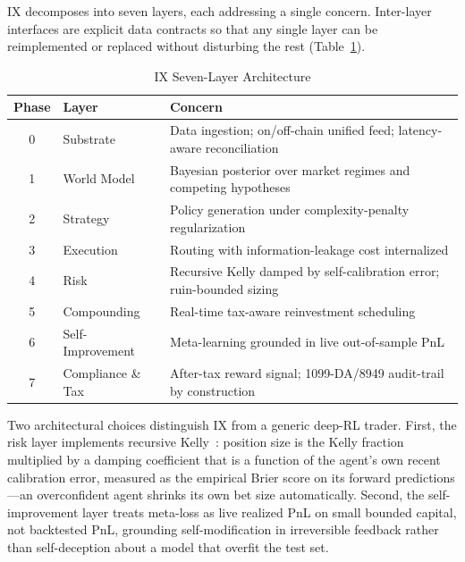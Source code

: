 \documentclass[conference,10pt,letterpaper]{IEEEtran}
\begin{document}
IX decomposes into seven layers, each addressing a single concern.
Inter-layer interfaces are explicit data contracts so that any single layer
can be reimplemented or replaced without disturbing the rest
(Table~\ref{tab:architecture}).

\begin{table}[!t]
\caption{IX Seven-Layer Architecture}
\label{tab:architecture}
\centering
\renewcommand{\arraystretch}{1.15}
\begin{tabularx}{\columnwidth}{@{}c l X@{}}
\toprule
\textbf{Phase} & \textbf{Layer} & \textbf{Concern} \\
\midrule
0 & Substrate                  & Data ingestion; on/off-chain unified feed; latency-aware reconciliation \\
1 & World Model                & Bayesian posterior over market regimes and competing hypotheses \\
2 & Strategy                   & Policy generation under complexity-penalty regularization \\
3 & Execution                  & Routing with information-leakage cost internalized \\
4 & Risk                       & Recursive Kelly damped by self-calibration error; ruin-bounded sizing \\
5 & Compounding                & Real-time tax-aware reinvestment scheduling \\
6 & Self-Improvement           & Meta-learning grounded in live out-of-sample PnL \\
7 & Compliance \& Tax          & After-tax reward signal; 1099-DA/8949 audit-trail by construction \\
\bottomrule
\end{tabularx}
\end{table}

Two architectural choices distinguish IX from a generic deep-RL trader.
First, the risk layer implements recursive Kelly~\cite{kelly1956new}:
position size is the Kelly fraction multiplied by a damping coefficient that
is a function of the agent's own recent calibration error, measured as the
empirical Brier score on its forward predictions---an overconfident agent
shrinks its own bet size automatically. Second, the self-improvement layer
treats meta-loss as live realized PnL on small bounded capital, not
backtested PnL, grounding self-modification in irreversible feedback rather
than self-deception about a model that overfit the test set.

\end{document}
